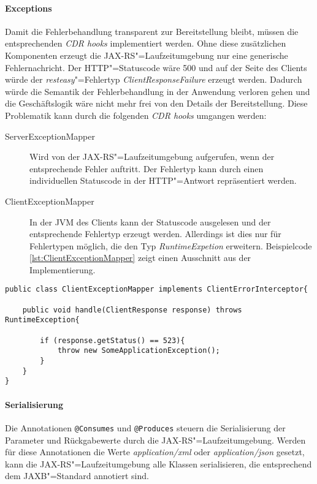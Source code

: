 \paragraph{Exceptions}
Damit die Fehlerbehandlung transparent zur Bereitstellung bleibt, müssen die entsprechenden \textit{CDR hooks} implementiert werden. Ohne diese zusätzlichen Komponenten erzeugt die \ac{JAX-RS}"=Laufzeitumgebung nur eine generische Fehlernachricht. 
Der \ac{HTTP}"=Statuscode wäre 500 und auf der Seite des Clients würde der \textit{resteasy}"=Fehlertyp \textit{ClientResponseFailure} erzeugt werden. 
Dadurch würde die Semantik der Fehlerbehandlung in der Anwendung verloren gehen und die Geschäftslogik wäre nicht mehr frei von den Details der Bereitstellung. Diese Problematik kann durch die folgenden \textit{CDR hooks} umgangen werden:
\begin{description}
\item [ServerExceptionMapper] Wird von der \ac{JAX-RS}"=Laufzeitumgebung aufgerufen, wenn der entsprechende Fehler auftritt. Der Fehlertyp kann durch einen individuellen Statuscode in der \ac{HTTP}"=Antwort repräsentiert werden.
\item [ClientExceptionMapper] In der \ac{JVM} des Clients kann der Statuscode ausgelesen und der entsprechende Fehlertyp erzeugt werden. Allerdings ist dies nur für Fehlertypen möglich, die den Typ \textit{RuntimeExpetion} erweitern. Beispielcode \ref{lst:ClientExceptionMapper} zeigt einen Ausschnitt aus der Implementierung.
\end{description}
\begin{lstlisting}[caption={ClientExceptionMapper},captionpos=b,label=lst:ClientExceptionMapper] 
public class ClientExceptionMapper implements ClientErrorInterceptor{

	public void handle(ClientResponse response) throws RuntimeException{
			
		if (response.getStatus() == 523){
			throw new SomeApplicationException();
		}
	}
}
\end{lstlisting}
\paragraph{Serialisierung}
Die Annotationen \colorbox{mygray}{\lstinline!@Consumes!} und \colorbox{mygray}{\lstinline!@Produces!} steuern die Serialisierung der Parameter und Rückgabewerte durch die \ac{JAX-RS}"=Laufzeitumgebung. 
Werden für diese Annotationen die Werte \textit{application/xml} oder \textit{application/json} gesetzt, kann die \ac{JAX-RS}"=Laufzeitumgebung alle Klassen serialisieren, die entsprechend dem \ac{JAXB}"=Standard annotiert sind.  
\newpage